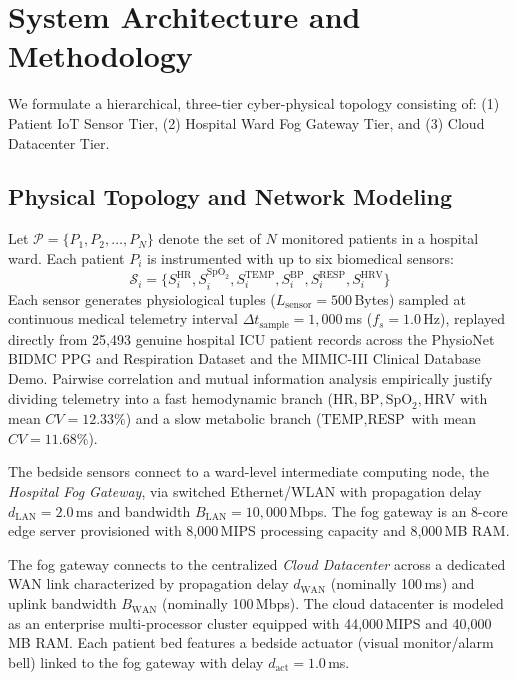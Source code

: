 \documentclass[conference]{IEEEtran}
\begin{document}
\section{System Architecture and Methodology}
We formulate a hierarchical, three-tier cyber-physical topology consisting of: (1) Patient IoT Sensor Tier, (2) Hospital Ward Fog Gateway Tier, and (3) Cloud Datacenter Tier.

\subsection{Physical Topology and Network Modeling}
Let $\mathcal{P} = \{P_1, P_2, \dots, P_N\}$ denote the set of $N$ monitored patients in a hospital ward. Each patient $P_i$ is instrumented with up to six biomedical sensors:
$$\mathcal{S}_i = \{S_{i}^{\text{HR}}, S_{i}^{\text{SpO}_2}, S_{i}^{\text{TEMP}}, S_{i}^{\text{BP}}, S_{i}^{\text{RESP}}, S_{i}^{\text{HRV}}\}$$
Each sensor generates physiological tuples ($L_{\text{sensor}} = 500$\,Bytes) sampled at continuous medical telemetry interval $\Delta t_{\text{sample}} = 1{,}000$\,ms ($f_s = 1.0$\,Hz), replayed directly from 25,493 genuine hospital ICU patient records across the PhysioNet BIDMC PPG and Respiration Dataset and the MIMIC-III Clinical Database Demo. Pairwise correlation and mutual information analysis empirically justify dividing telemetry into a fast hemodynamic branch ($\text{HR}, \text{BP}, \text{SpO}_2, \text{HRV}$ with mean $CV=12.33\%$) and a slow metabolic branch ($\text{TEMP}, \text{RESP}$ with mean $CV=11.68\%$).

The bedside sensors connect to a ward-level intermediate computing node, the \textit{Hospital Fog Gateway}, via switched Ethernet/WLAN with propagation delay $d_{\text{LAN}} = 2.0$\,ms and bandwidth $B_{\text{LAN}} = 10{,}000$\,Mbps. The fog gateway is an 8-core edge server provisioned with 8,000\,MIPS processing capacity and 8,000\,MB RAM.

The fog gateway connects to the centralized \textit{Cloud Datacenter} across a dedicated WAN link characterized by propagation delay $d_{\text{WAN}}$ (nominally 100\,ms) and uplink bandwidth $B_{\text{WAN}}$ (nominally 100\,Mbps). The cloud datacenter is modeled as an enterprise multi-processor cluster equipped with 44,000\,MIPS and 40,000\,MB RAM. Each patient bed features a bedside actuator (visual monitor/alarm bell) linked to the fog gateway with delay $d_{\text{act}} = 1.0$\,ms.
\end{document}
